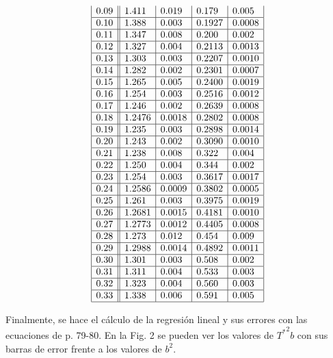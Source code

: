 \documentclass{article}
\begin{document}
\begin{multicols}{2}
\begin{center}
$$\begin{array}{|l||l|l|l|l|}
    0.09 & 1.411 & 0.019 & 0.179 & 0.005  \\ \hline
    0.10 & 1.388 & 0.003 & 0.1927 & 0.0008  \\ \hline
    0.11 & 1.347 & 0.008 & 0.200 & 0.002  \\ \hline
    0.12 & 1.327 & 0.004 & 0.2113 & 0.0013  \\ \hline
    0.13 & 1.303 & 0.003 & 0.2207 & 0.0010  \\ \hline
    0.14 & 1.282 & 0.002 & 0.2301 & 0.0007  \\ \hline
    0.15 & 1.265 & 0.005 & 0.2400 & 0.0019  \\ \hline
    0.16 & 1.254 & 0.003 & 0.2516 & 0.0012  \\ \hline
    0.17 & 1.246 & 0.002 & 0.2639 & 0.0008  \\ \hline
    0.18 & 1.2476 & 0.0018 & 0.2802 & 0.0008  \\ \hline
    0.19 & 1.235 & 0.003 & 0.2898 & 0.0014  \\ \hline
    0.20 & 1.243 & 0.002 & 0.3090 & 0.0010  \\ \hline
    0.21 & 1.238 & 0.008 & 0.322 & 0.004  \\ \hline
    0.22 & 1.250 & 0.004 & 0.344 & 0.002  \\ \hline
    0.23 & 1.254 & 0.003 & 0.3617 & 0.0017  \\ \hline
    0.24 & 1.2586 & 0.0009 & 0.3802 & 0.0005  \\ \hline
    0.25 & 1.261 & 0.003 & 0.3975 & 0.0019  \\ \hline
    0.26 & 1.2681 & 0.0015 & 0.4181 & 0.0010  \\ \hline
    0.27 & 1.2773 & 0.0012 & 0.4405 & 0.0008  \\ \hline
    0.28 & 1.273 & 0.012 & 0.454 & 0.009  \\ \hline
    0.29 & 1.2988 & 0.0014 & 0.4892 & 0.0011  \\ \hline
    0.30 & 1.301 & 0.003 & 0.508 & 0.002  \\ \hline
    0.31 & 1.311 & 0.004 & 0.533 & 0.003  \\ \hline
    0.32 & 1.323 & 0.004 & 0.560 & 0.003  \\ \hline
    0.33 & 1.338 & 0.006 & 0.591 & 0.005  \\ \hline
    \end{array}
$$
\end{center}
Finalmente, se hace el cálculo de la regresión lineal y sus errores con las ecuaciones de \cite{manual} p. 79-80. En la Fig. 2 se pueden ver los valores de ${T^*}^2b$ con sus barras de error frente a los valores de $b^2$.

\end{multicols}
\end{document}
